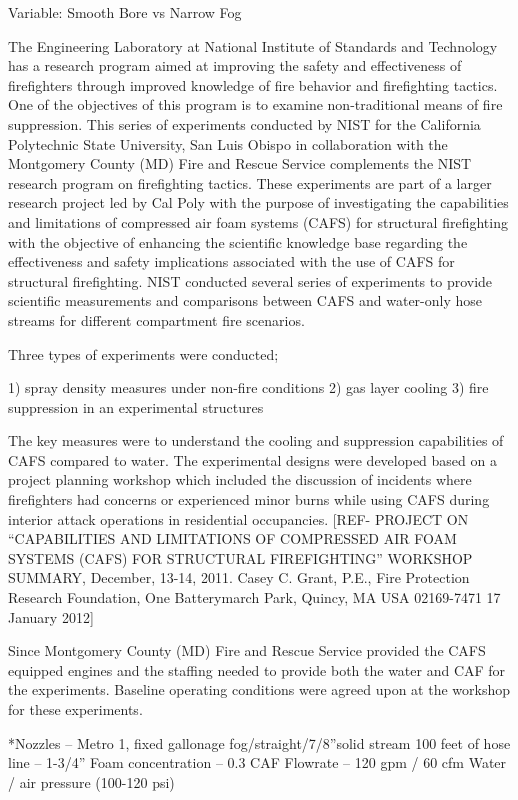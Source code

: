 \documentclass[12pt,oneside]{book}
\begin{document}
Variable: 
Smooth Bore vs Narrow Fog

The Engineering Laboratory at National Institute of Standards and Technology has a research program aimed at improving the safety and effectiveness of firefighters through improved knowledge of fire behavior and firefighting tactics.  One of the objectives of this program is to examine non-traditional means of fire suppression.   This series of experiments conducted by NIST for the California Polytechnic State University, San Luis Obispo in collaboration with the Montgomery County (MD) Fire and Rescue Service complements the NIST research program on firefighting tactics.  These experiments are part of a larger research project led by Cal Poly with the purpose of investigating the capabilities and limitations of compressed air foam systems (CAFS) for structural firefighting with the objective of enhancing the scientific knowledge base regarding the effectiveness and safety implications associated with the use of CAFS for structural firefighting.  
NIST conducted several series of experiments to provide scientific measurements and comparisons between CAFS and water-only hose streams for different compartment fire scenarios.  

Three types of experiments were conducted; 

1)            spray density measures under non-fire conditions 
2)            gas layer cooling 
3)            fire suppression in an experimental structures

The key measures were to understand the cooling and suppression capabilities of CAFS compared to water.   The experimental designs were developed based on a project planning workshop which included the discussion of incidents where firefighters had concerns or experienced minor burns while using CAFS during interior attack operations in residential occupancies.  [REF-  PROJECT ON “CAPABILITIES AND LIMITATIONS OF COMPRESSED AIR FOAM SYSTEMS (CAFS) FOR STRUCTURAL FIREFIGHTING” WORKSHOP SUMMARY, December, 13-14, 2011.   Casey C. Grant, P.E., Fire Protection Research Foundation, One Batterymarch Park, Quincy, MA USA 02169-7471
17 January 2012]


Since Montgomery County (MD) Fire and Rescue Service provided the CAFS equipped engines and the staffing needed to provide both the water and CAF for the experiments.  Baseline operating conditions were agreed upon at the workshop for these experiments. 

*Nozzles – Metro 1, fixed gallonage fog/straight/7/8”solid stream  
100 feet of hose line – 1-3/4”
Foam concentration – 0.3%
CAF Flowrate – 120 gpm / 60 cfm 
Water / air pressure (100-120 psi)
\end{document}
